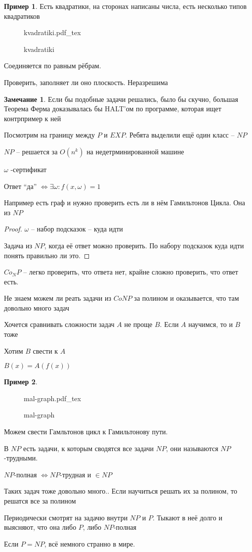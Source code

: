 \documentclass{book}
\theoremstyle{definition}
\newtheorem*{note}{Замечание}
\newtheorem*{example}{Пример}
\newcommand{\incfig}[1]{%
    \def\svgwidth{\columnwidth}
    {#1.pdf_tex}
}
\begin{document}
\begin{example}
    Есть квадратики, на сторонах написаны числа, есть несколько типов квадратиков

\begin{figure}[!ht]
    \centering
    \incfig{kvadratiki}
    \caption{kvadratiki}
    \label{fig:kvadratiki}
\end{figure}

Соединяется по равным рёбрам.

Проверить, заполняет ли оно плоскость. Неразрешима
\end{example}

\begin{note}
    Если бы подобные задачи решались, было бы скучно, большая Теорема Ферма доказывалась бы HALT'ом по программе, которая ищет контрпример к ней
\end{note}

Посмотрим на границу между $P$ и  $EXP$. Ребята выделили ещё один класс --  $NP$

$NP$ -- решается за $O\left(n^k  \right) $ на недетрминированной машине

$\omega$ -сертификат

Ответ ``да'' $\iff \exists \omega: f(x, \omega) = 1$

Например есть граф и нужно проверить есть ли в нём Гамильтонов Цикла. Она из $NP$
 \begin{proof}
    $\omega$ -- набор подсказок -- куда идти

    Задача из  $NP$, когда её ответ можно проверить. По набору подсказок куда идти понять правильно ли это.
\end{proof}

$Co_NP$ -- легко проверить, что ответа нет, крайне сложно проверить, что ответ есть.

Не знаем можем ли реать задачи из  $CoNP$ за полином и оказывается, что там довольно много задач


Хочется сравнивать сложности задач  $A$ не проще  $B$. Если  $A$ научимся, то и  $B$ тоже

Хотим  $B$ свести к  $A$

$B(x) = A(f\left(x \right) )$

\begin{example}
\begin{figure}[!ht]
    \centering
    \incfig{mal-graph}
    \caption{mal-graph}
    \label{fig:mal-graph}
\end{figure}

Можем свести Гамльтонов цикл к Гамильтонову пути.

В $NP$ есть задачи, к которым сводятся все задачи  $NP$, они называются  $NP$-трудными.

 $NP$-полная  $\iff NP$-трудная и $\in NP$

 Таких задач тоже довольно много.. Если научиться решать их за полином, то решатся все за полином

 Периодически смотрят на задачю внутри  $NP$ и  $P$. Тыкают в неё долго и выясняют, что она либо  $P$, либо  $NP$-полная
 
 Если  $P = NP$, всё немного странно в мире.
\end{example}
\end{document}
